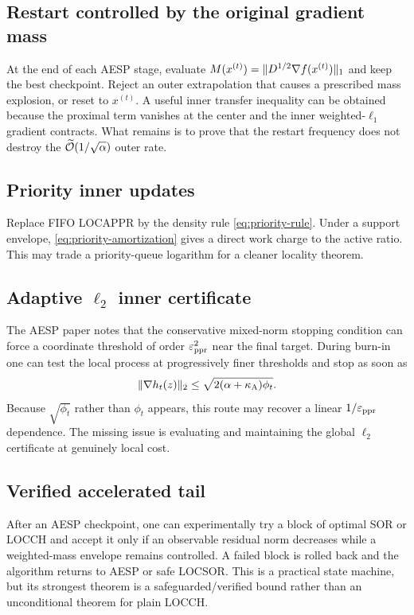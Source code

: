 \subsection{Restart controlled by the original gradient mass}

At the end of each AESP stage, evaluate
$M(x^{(t)})=\lVert D^{1/2}\nabla f(x^{(t)})\rVert_1$ and keep the best checkpoint.
Reject an
outer extrapolation that causes a prescribed mass explosion, or reset to
$x^{(t)}$.  A useful inner transfer inequality can be obtained because the
proximal term vanishes at the center and the inner weighted-$\ell_1$ gradient
contracts.  What remains is to prove that the restart frequency does not
destroy the $\widetilde{\mathcal{O}}(1/\sqrt\alpha)$ outer rate.

\subsection{Priority inner updates}

Replace FIFO LOCAPPR by the density rule \cref{eq:priority-rule}.  Under a
support envelope, \cref{eq:priority-amortization} gives a direct work charge
to the active ratio.  This may trade a priority-queue logarithm for a cleaner
locality theorem.

\subsection{Adaptive $\ell_2$ inner certificate}

The AESP paper notes that the conservative mixed-norm stopping condition can
force a coordinate threshold of order $\varepsilon_{\mathrm{ppr}}^2$ near the final target.  During
burn-in one can test the local process at progressively finer thresholds and
stop as soon as
\begin{equation}
  \lVert\nabla h_t(z)\rVert_2
  \leq\sqrt{2(\alpha+\kappa_{\rm A})\phi_t}.
  \label{eq:l2-inner-certificate}
\end{equation}
Because $\sqrt{\phi_t}$ rather than $\phi_t$ appears, this route may recover a
linear $1/\varepsilon_{\mathrm{ppr}}$ dependence.  The missing issue is evaluating and maintaining
the global $\ell_2$ certificate at genuinely local cost.

\subsection{Verified accelerated tail}

After an AESP checkpoint, one can experimentally try a block of optimal SOR
or LOCCH and accept it only if an observable residual norm decreases while a
weighted-mass envelope remains controlled.  A failed block is rolled back and
the algorithm returns to AESP or safe LOCSOR.  This is a practical state
machine, but its strongest theorem is a safeguarded/verified bound rather than
an unconditional theorem for plain LOCCH.

